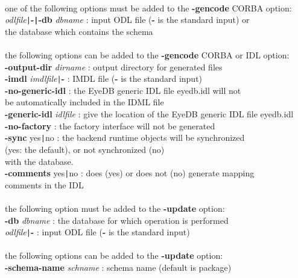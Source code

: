 \begin{tabbing}
\\
one of the following options must be added to the {\bf -gencode} CORBA option:\\
\emph{odlfile}\texttt{|}{\bf -\texttt{|}-db} \emph{dbname} \>: input ODL file ({\bf -} is the standard input) or\\
                             \>\>the database which contains the schema\\
\\
the following options can be added to the {\bf -gencode} CORBA or IDL option:\\
{\bf -output-dir} \emph{dirname}        \>: output directory for generated files\\
{\bf -imdl} \emph{imdlfile}\texttt{|}{\bf -}           \>: IMDL file ({\bf -} is the standard input)\\
{\bf -no-generic-idl}              \>: the EyeDB generic IDL file eyedb.idl will not\\
                             \>\>  be automatically included in the IDML file\\
{\bf -generic-idl} \emph{idlfile}       \>: give the location of the EyeDB generic IDL file eyedb.idl\\
{\bf -no-factory}                  \>: the factory interface will not be generated\\
{\bf -sync} yes\texttt{|}no                 \>: the backend runtime objects will be synchronized\\
                             \>\>  (yes: the default), or not synchronized (no)\\
                             \>\>  with the database.\\
{\bf -comments} yes\texttt{|}no             \>: does (yes) or does not (no) generate mapping\\
                              \>\>comments in the IDL\\
\\
the following option must be added to the {\bf -update} option:\\
{\bf -db} \emph{dbname}                 \>: the database for which operation is performed\\
\emph{odlfile}\texttt{|}{\bf -}                  \>: input ODL file ({\bf -} is the standard input)\\
\\
the following options can be added to the {\bf -update} option:\\
{\bf -schema-name} \emph{schname}       \>: schema name (default is package)\\

\end{tabbing}
